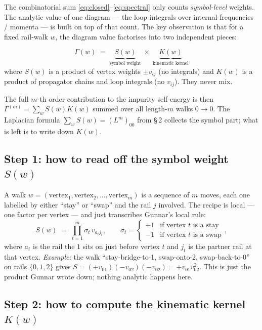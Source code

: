 \documentclass[11pt,a4paper]{article}
\begin{document}
The combinatorial sum \eqref{eq:closed}--\eqref{eq:spectral} only counts
\emph{symbol-level} weights. The analytic value of one diagram --- the
loop integrals over internal frequencies / momenta --- is built on top
of that count. The key observation is that for a fixed rail-walk $w$,
the diagram value factorises into two independent pieces:
\begin{commentbox}[title=The recipe for one diagram]
\[
\boxed{\;\Gamma(w) \;=\; \underbrace{S(w)}_{\text{symbol weight}}
\;\times\;\underbrace{K(w)}_{\text{kinematic kernel}}\;}
\]
where $S(w)$ is a product of vertex weights $\pm v_{ij}$ (no integrals)
and $K(w)$ is a product of propagator chains and loop integrals (no
$v_{ij}$). They never mix.
\end{commentbox}
The full $m$-th order contribution to the impurity self-energy is then
$\Gamma^{(m)} = \sum_{w}S(w)K(w)$ summed over all length-$m$ walks
$0\!\to\!0$. The Laplacian formula $\sum_{w}S(w) = (L^{m})_{00}$ from
\S\,2 collects the symbol part; what is left is to write down $K(w)$.

\subsection*{Step 1: how to read off the symbol weight $S(w)$}

A walk $w = (\text{vertex}_{1},\text{vertex}_{2},\dots,\text{vertex}_{m})$
is a sequence of $m$ moves, each one labelled by either ``stay'' or
``swap'' and the rail $j$ involved. The recipe is local --- one factor
per vertex --- and just transcribes Gunnar's local rule:
\begin{equation}\label{eq:symbol-weight}
S(w) \;=\; \prod_{t=1}^{m}\sigma_{t}\,v_{a_{t}j_{t}},
\qquad
\sigma_{t} = \begin{cases}+1 &\text{if vertex $t$ is a stay}\\
-1 &\text{if vertex $t$ is a swap}\end{cases},
\end{equation}
where $a_{t}$ is the rail the $1$ sits on just before vertex $t$ and
$j_{t}$ is the partner rail at that vertex. \emph{Example:} the walk
``stay-bridge-to-1, swap-onto-2, swap-back-to-0'' on rails $\{0,1,2\}$
gives $S = (+v_{01})(-v_{02})(-v_{02}) = +v_{01}v_{02}^{2}$.
This is just the product Gunnar wrote down; nothing analytic happens
here.

\subsection*{Step 2: how to compute the kinematic kernel $K(w)$}
\end{document}
